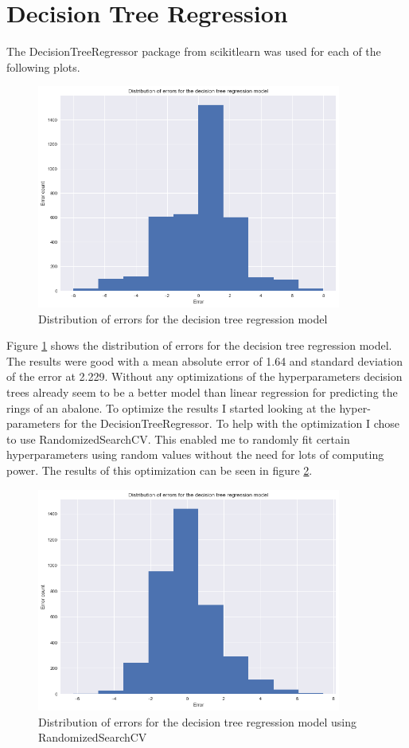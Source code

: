 \section{Decision Tree Regression}

The DecisionTreeRegressor package from scikitlearn was used for each of the following plots. 
\begin{figure}[H]
  \centering
  \includegraphics[scale=0.5,width=100mm]{./images/abalone-decision-tree-regression-start.png}
  \caption{Distribution of errors for the decision tree regression model}
  \label{fig:abalone-decision-tree-regression-start}
\end{figure}
Figure \ref{fig:abalone-decision-tree-regression-start} shows the distribution of errors for the decision tree regression model. The results were good with a mean absolute error of 1.64 and standard deviation of the error at 2.229. Without any optimizations of the hyperparameters decision trees already seem to be a better model than linear regression for predicting the rings of an abalone. To optimize the results I started looking at the hyper-parameters for the DecisionTreeRegressor. To help with the optimization I chose to use RandomizedSearchCV. This enabled me to randomly fit certain hyperparameters using random values without the need for lots of computing power. The results of this optimization can be seen in figure \ref{fig:abalone-decision-tree-regression-randomcv}.
\begin{figure}[H]
  \centering
  \includegraphics[scale=0.5,width=100mm]{./images/abalone-decision-tree-regression-randomcv.png}
  \caption{Distribution of errors for the decision tree regression model using RandomizedSearchCV}
  \label{fig:abalone-decision-tree-regression-randomcv}
\end{figure}
